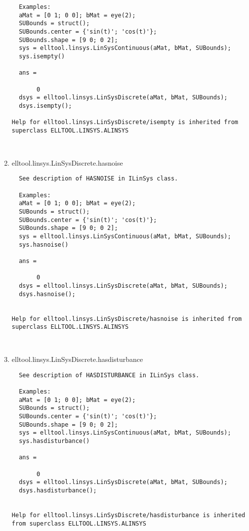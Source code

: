 \begin{enumerate}
\begin{lstlisting}
  Examples:
  aMat = [0 1; 0 0]; bMat = eye(2);
  SUBounds = struct();
  SUBounds.center = {'sin(t)'; 'cos(t)'};
  SUBounds.shape = [9 0; 0 2];
  sys = elltool.linsys.LinSysContinuous(aMat, bMat, SUBounds);
  sys.isempty()

  ans =

       0
  dsys = elltool.linsys.LinSysDiscrete(aMat, bMat, SUBounds);
  dsys.isempty();

Help for elltool.linsys.LinSysDiscrete/isempty is inherited from superclass ELLTOOL.LINSYS.ALINSYS



\end{lstlisting}
\fontfamily{\familydefault}
\selectfont
\item {elltool.linsys.LinSysDiscrete.hasnoise}
\selectfont
\begin{lstlisting}
  See description of HASNOISE in ILinSys class.

  Examples:
  aMat = [0 1; 0 0]; bMat = eye(2);
  SUBounds = struct();
  SUBounds.center = {'sin(t)'; 'cos(t)'};
  SUBounds.shape = [9 0; 0 2];
  sys = elltool.linsys.LinSysContinuous(aMat, bMat, SUBounds);
  sys.hasnoise()

  ans =

       0
  dsys = elltool.linsys.LinSysDiscrete(aMat, bMat, SUBounds);
  dsys.hasnoise();


Help for elltool.linsys.LinSysDiscrete/hasnoise is inherited from superclass ELLTOOL.LINSYS.ALINSYS



\end{lstlisting}
\fontfamily{\familydefault}
\selectfont
\item {elltool.linsys.LinSysDiscrete.hasdisturbance}
\selectfont
\begin{lstlisting}
  See description of HASDISTURBANCE in ILinSys class.

  Examples:
  aMat = [0 1; 0 0]; bMat = eye(2);
  SUBounds = struct();
  SUBounds.center = {'sin(t)'; 'cos(t)'};
  SUBounds.shape = [9 0; 0 2];
  sys = elltool.linsys.LinSysContinuous(aMat, bMat, SUBounds);
  sys.hasdisturbance()

  ans =

       0
  dsys = elltool.linsys.LinSysDiscrete(aMat, bMat, SUBounds);
  dsys.hasdisturbance();


Help for elltool.linsys.LinSysDiscrete/hasdisturbance is inherited from superclass ELLTOOL.LINSYS.ALINSYS




\end{lstlisting}
\end{enumerate}
